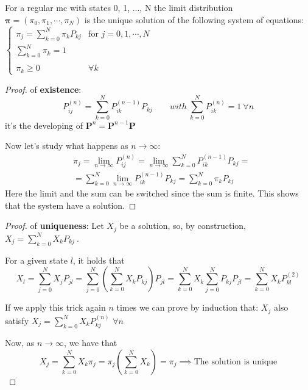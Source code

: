 	\begin{theorem}
		For a regular \gls{mc} with states 0, 1, ..., N the limit distribution $\bm\pi = (\pi_0,\pi_1,\cdots,\pi_N)$ is the unique solution of the following system of equations:\\

		$\begin{cases}
			\pi_j = \sum\limits_{k=0}^N \pi_k P_{k j} & \text{for } j = 0,1, \cdots, N \\
			\sum\limits_{k=0}^N \pi_k = 1\\
			\\ \pi_k \ge 0 & \forall k
		\end{cases}$
	\end{theorem}

	\begin{proof} of \textbf{existence}:
		\begin{equation}
  			P_{i j}^{(n)} = \sum\limits_{k=0}^N P_{ik}^{(n-1)} P_{k j}
			\qquad with ~\sum\limits_{k=0}^N P_{ik}^{(n)} = 1 ~\forall n
		\end{equation}
		it's the developing of $\bm P^n = \bm P^{n-1} \bm P$

		Now let's study what happens as $ n \to \infty $:
		\begin{equation}
			\begin{split}
				&\pi_j = \lim_{n \to \infty} P_{ij}^{(n)} = \lim_{n \to \infty} \sum\limits_{k=0}^N P_{ik}^{(n-1)} P_{k j
				} =\\
				&= \sum\limits_{k=0}^N \lim_{n \to \infty} P_{ik}^{(n-1)} P_{k j
				} = \sum\limits_{k=0}^N \pi_k P_{kj}
			\end{split}
		\end{equation}
		Here the limit and the sum can be switched since the sum is finite.
		This shows that the system have a solution.
	\end{proof}

	\begin{proof} of \textbf{uniqueness}:
		Let $X_j$ be a solution, so, by construction, $X_j = \sum\limits_{k=0}^N X_k P_{kj} ~$.

		For a given state $l$, it holds that
		\begin{equation}
				X_l = \sum\limits_{j=0}^N X_j P_{jl} =  \sum\limits_{j=0}^N \left( \sum\limits_{k=0}^N X_k P_{kj} \right) P_{jl} =  \sum\limits_{k=0}^N X_k \sum\limits_{j=0}^N P_{kj} P_{jl} = \sum\limits_{k=0}^N X_k P_{kl}^{(2)}
		\end{equation}

		If we apply this trick again $n$ times we can prove by induction that:
		$X_j$ also satisfy $ X_j = \sum\limits_{k=0}^N X_k P_{kj}^{(n)} $ \quad  $\forall n $

		Now, as $n \to \infty$, we have that
		\begin{equation}
			X_j = \sum\limits_{k=0}^N X_k \pi_j = \pi_j (\sum\limits_{k=0}^N X_k) = \pi_j  \implies
			\text{The solution is unique}
		\end{equation}
	\end{proof}

